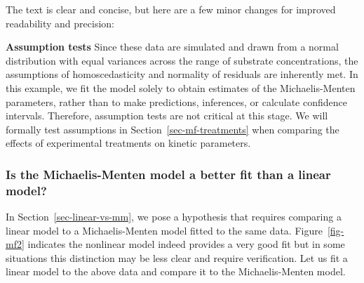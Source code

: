 \documentclass[
  letterpaper,
]{book}
\begin{document}
The text is clear and concise, but here are a few minor changes for
improved readability and precision:

\textbf{Assumption tests} Since these data are simulated and drawn from
a normal distribution with equal variances across the range of substrate
concentrations, the assumptions of homoscedasticity and normality of
residuals are inherently met. In this example, we fit the model solely
to obtain estimates of the Michaelis-Menten parameters, rather than to
make predictions, inferences, or calculate confidence intervals.
Therefore, assumption tests are not critical at this stage. We will
formally test assumptions in Section~\ref{sec-mf-treatments} when
comparing the effects of experimental treatments on kinetic parameters.

\subsubsection{Is the Michaelis-Menten model a better fit than a linear
model?}\label{is-the-michaelis-menten-model-a-better-fit-than-a-linear-model}

In Section~\ref{sec-linear-vs-mm}, we pose a hypothesis that requires
comparing a linear model to a Michaelis-Menten model fitted to the same
data. Figure~\ref{fig-mf2} indicates the nonlinear model indeed provides
a very good fit but in some situations this distinction may be less
clear and require verification. Let us fit a linear model to the above
data and compare it to the Michaelis-Menten model.
\end{document}
